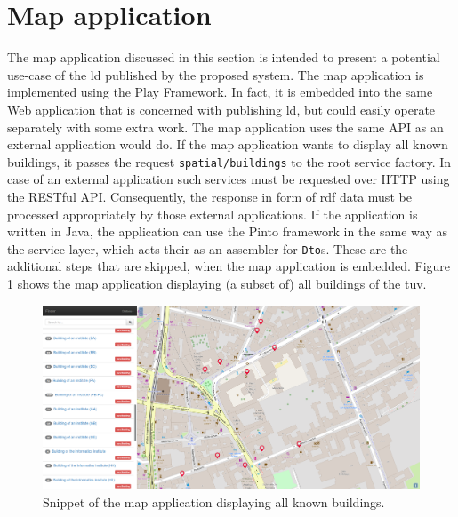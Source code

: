 \documentclass[draft,final]{vutinfth} %
\begin{document}
\section{Map application}
\label{solution-map-application}
The map application discussed in this section is intended to present a potential use-case of the \gls{ld} published by the proposed system. The map application is implemented using the Play Framework. In fact, it is embedded into the same Web application that is concerned with publishing \gls{ld}, but could easily operate separately with some extra work. The map application uses the same API as an external application would do. If the map application wants to display all known buildings, it passes the request \texttt{spatial/buildings} to the root service factory. In case of an external application such services must be requested over HTTP using the RESTful API. Consequently, the response in form of \gls{rdf} data must be processed appropriately by those external applications. If the application is written in Java, the application can use the Pinto framework in the same way as the service layer, which acts their as an assembler for \texttt{Dto}s. These are the additional steps that are skipped, when the map application is embedded. Figure \ref{fig:solution-architectural-map-app:buildings} shows the map application displaying (a subset of) all buildings of the \gls{tuv}.

\begin{figure}
    \centering
    \includegraphics[width=1.0\textwidth]{graphics/solution/app/map_application.png}
    \caption{Snippet of the map application displaying all known buildings.}
    \label{fig:solution-architectural-map-app:buildings}
\end{figure}
\end{document}
